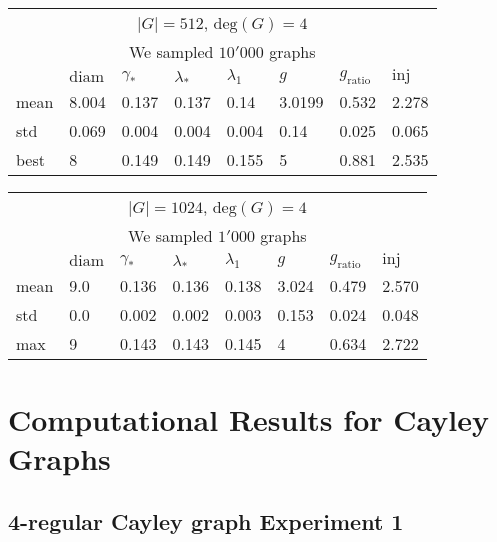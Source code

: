 \vspace{1em}

\begin{center}
	\begin{tabular}{ p{1cm}|p{1cm}|p{1cm}|p{1cm}|p{1cm}|p{1cm}|p{1cm}|p{1cm} }
		\multicolumn{8}{c}{$|G| = 512$, $\mathrm{deg}(G) = 4$} \\
		\multicolumn{8}{c}{We sampled $10'000$ graphs} \\
		& $\mathrm{diam}$ & $\gamma_*$ & $\lambda_{*}$  &  $\lambda_1$ & $g$ & $g_{\mathrm{ratio}}$ & $\mathrm{inj}$     \\
		\hline
		mean & 8.004 & 0.137 & 0.137 &  0.14 & 3.0199 & 0.532 & 2.278 \\
		std & 0.069 & 0.004 & 0.004 &  0.004 & 0.14 & 0.025 & 0.065 \\
		best & 8 & 0.149 & 0.149 &  0.155 & 5 & 0.881 & 2.535
	\end{tabular}
\end{center}

\vspace{1em}

\begin{center}
	\begin{tabular}{ p{1cm}|p{1cm}|p{1cm}|p{1cm}|p{1cm}|p{1cm}|p{1cm}|p{1cm} }
		\multicolumn{8}{c}{$|G| = 1024$, $\mathrm{deg}(G) = 4$} \\
		\multicolumn{8}{c}{We sampled $1'000$ graphs} \\
		& $\mathrm{diam}$ & $\gamma_*$ & $\lambda_{*}$  &  $\lambda_1$ & $g$ & $g_{\mathrm{ratio}}$ & $\mathrm{inj}$     \\
		\hline
		mean & 9.0 & 0.136 & 0.136 &  0.138 & 3.024 & 0.479 & 2.570 \\
		std & 0.0 & 0.002 & 0.002 &  0.003 & 0.153 & 0.024 & 0.048 \\
		max & 9 & 0.143 & 0.143 &  0.145 & 4 & 0.634 & 2.722 \\
	\end{tabular}
\end{center}




\newpage

\section{Computational Results for Cayley Graphs}

\subsection{4-regular Cayley graph Experiment 1}

